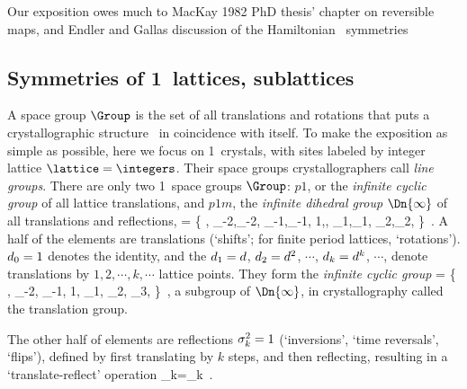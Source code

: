 Our exposition owes much to MacKay 1982 PhD thesis' chapter on
reversible maps, and Endler and Gallas discussion of the Hamiltonian
\HenonMap\ symmetries


\subsection{Symmetries of 1\dmn\ lattices, sublattices}
\label{s:1dLatt}

A space group $\Group$ is the set of all translations and rotations that
puts a crystallographic structure \lattice\ in coincidence with itself.
To make the exposition as simple as possible, here we focus on 1\dmn\
crystals, with sites labeled by integer lattice $ \lattice=\integers$.
Their space groups crystallographers\rf{Dresselhaus07} call \emph{line
groups}.
%
There are only two 
{1\dmn\ space groups}  $\Group$: $p1$, or the \emph{infinite cyclic
group}  \Cn{\infty} of all lattice translations,
and
$p1m$, the \emph{infinite dihedral group} $\Dn{\infty}$  of all
translations and reflections,
\beq
  \Dn{\infty} = \{
\cdots, \shift_{-2},\Refl_{-2}, \shift_{-1},\Refl_{-1},
        1,\Refl,
        \shift_{1},\Refl_{1}, \shift_{2},\Refl_{2}, \cdots
             \}
\,.
A half of the elements are translations (`shifts'; for finite period
lattices, `rotations').
$d_{0}=1$ denotes the identity,
and
the
$d_{1}=d$, $d_{2}=d^2$, $\cdots$,
$d_{k}=d^k$, $\cdots$,
denote translations by $1,2,\cdots,k,\cdots$ lattice points. They form
the \emph{infinite cyclic group}
\beq
\Cn{\infty}
    =       \{
\cdots, \shift_{-2}, \shift_{-1},
        1,
        \shift_{1}, \shift_{2}, \shift_{3}, \cdots
             \}
\,,
\label{C_infty}
\eeq
a subgroup of $\Dn{\infty}$,
in crystallography called the translation group.

The other half of elements are reflections $\sigma_{k}^2=1$
(`inversions', `time reversals', `flips'), defined by first translating
by $k$ steps, and then reflecting, resulting in a `translate-reflect'
operation
\beq
\Refl_{k}=\Refl\shift_k
\,.

